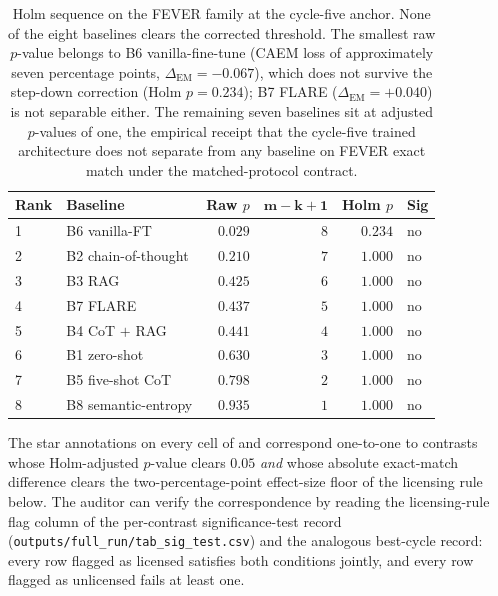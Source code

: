 \begin{table}[!t]
\centering\footnotesize
\setlength{\tabcolsep}{6pt}
\renewcommand{\arraystretch}{1.1}
\begin{tabular}{@{}llrrrl@{}}
\toprule
\textbf{Rank} & \textbf{Baseline} & \textbf{Raw $p$} & $\boldsymbol{m-k+1}$ & \textbf{Holm $p$} & \textbf{Sig} \\
\midrule
1 & B6 vanilla-FT       & $0.029$ & $8$ & $0.234$ & no \\
2 & B2 chain-of-thought & $0.210$ & $7$ & $1.000$ & no \\
3 & B3 RAG              & $0.425$ & $6$ & $1.000$ & no \\
4 & B7 FLARE            & $0.437$ & $5$ & $1.000$ & no \\
5 & B4 CoT $+$ RAG      & $0.441$ & $4$ & $1.000$ & no \\
6 & B1 zero-shot        & $0.630$ & $3$ & $1.000$ & no \\
7 & B5 five-shot CoT    & $0.798$ & $2$ & $1.000$ & no \\
8 & B8 semantic-entropy & $0.935$ & $1$ & $1.000$ & no \\
\bottomrule
\end{tabular}
\caption[Holm sequence on the FEVER family at the cycle-five anchor]{Holm sequence on the FEVER family at the cycle-five anchor. None of the eight baselines clears the corrected threshold. The smallest raw $p$-value belongs to B6 vanilla-fine-tune (CAEM loss of approximately seven percentage points, $\Delta_{\text{EM}} = -0.067$), which does not survive the step-down correction (Holm $p = 0.234$); B7 FLARE ($\Delta_{\text{EM}} = +0.040$) is not separable either. The remaining seven baselines sit at adjusted $p$-values of one, the empirical receipt that the cycle-five trained architecture does not separate from any baseline on FEVER exact match under the matched-protocol contract.}
\label{tab:app-sig-holm-fever}
\end{table}

The star annotations on every cell of  and  correspond one-to-one to contrasts whose Holm-adjusted $p$-value clears $0.05$ \emph{and} whose absolute exact-match difference clears the two-percentage-point effect-size floor of the licensing rule below. The auditor can verify the correspondence by reading the licensing-rule flag column of the per-contrast significance-test record (\texttt{outputs/full\_run/\allowbreak tab\_sig\_test.csv}) and the analogous best-cycle record: every row flagged as licensed satisfies both conditions jointly, and every row flagged as unlicensed fails at least one.


